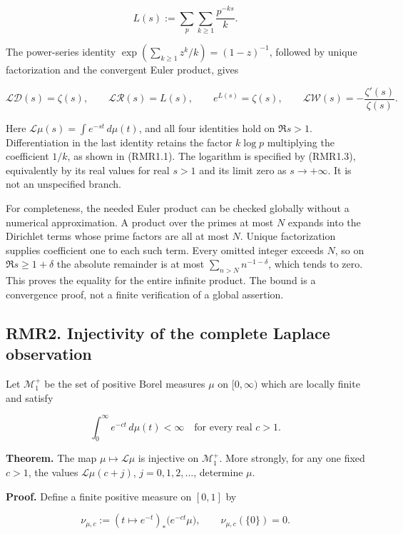 \[
L(s):=\sum_p\sum_{k\ge1}\frac{p^{-ks}}k.
\tag{RMR1.3}
\]

The power-series identity \(\exp(\sum_{k\ge1}z^k/k)=(1-z)^{-1}\),
followed by unique factorization and the convergent Euler product, gives

\[
\mathcal L\mathcal D(s)=\zeta(s),\qquad
\mathcal L\mathcal R(s)=L(s),\qquad
e^{L(s)}=\zeta(s),\qquad
\mathcal L\mathcal W(s)=-\frac{\zeta'(s)}{\zeta(s)}.
\tag{RMR1.4}
\]

Here \(\mathcal L\mu(s)=\int e^{-st}\,d\mu(t)\), and all four identities
hold on \(\Re s>1\). Differentiation in the last identity retains the
factor \(k\log p\) multiplying the coefficient \(1/k\), as shown in
(RMR1.1). The logarithm is specified by (RMR1.3), equivalently by its
real values for real \(s>1\) and its limit zero as \(s\to+\infty\). It
is not an unspecified branch.

For completeness, the needed Euler product can be checked globally
without a numerical approximation. A product over the primes at most
\(N\) expands into the Dirichlet terms whose prime factors are all at
most \(N\). Unique factorization supplies coefficient one to each such
term. Every omitted integer exceeds \(N\), so on \(\Re s\ge1+\delta\)
the absolute remainder is at most \(\sum_{n>N}n^{-1-\delta}\), which
tends to zero. This proves the equality for the entire infinite product.
The bound is a convergence proof, not a finite verification of a global
assertion.

\subsection{RMR2. Injectivity of the complete Laplace
observation}\label{rmr2.-injectivity-of-the-complete-laplace-observation}

Let \(\mathscr M_1^+\) be the set of positive Borel measures \(\mu\) on
\([0,\infty)\) which are locally finite and satisfy

\[
\int_0^\infty e^{-ct}\,d\mu(t)<\infty
\quad\text{for every real }c>1.
\tag{RMR2.1}
\]

\textbf{Theorem.} The map \(\mu\mapsto\mathcal L\mu\) is injective on
\(\mathscr M_1^+\). More strongly, for any one fixed \(c>1\), the values
\(\mathcal L\mu(c+j)\), \(j=0,1,2,\ldots\), determine \(\mu\).

\textbf{Proof.} Define a finite positive measure on \([0,1]\) by

\[
\nu_{\mu,c}:=(t\mapsto e^{-t})_*\bigl(e^{-ct}\mu\bigr),
\qquad \nu_{\mu,c}(\{0\})=0.
\tag{RMR2.2}
\]

